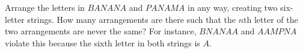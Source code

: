 Arrange the letters in $BANANA$ and $PANAMA$ in any way, creating two six-letter strings. How many arrangements are there such that the $n$th letter of the two arrangements are never the same? For instance, $BNANAA$ and $AAMPNA$ violate this because the sixth letter in both strings is $A$.
